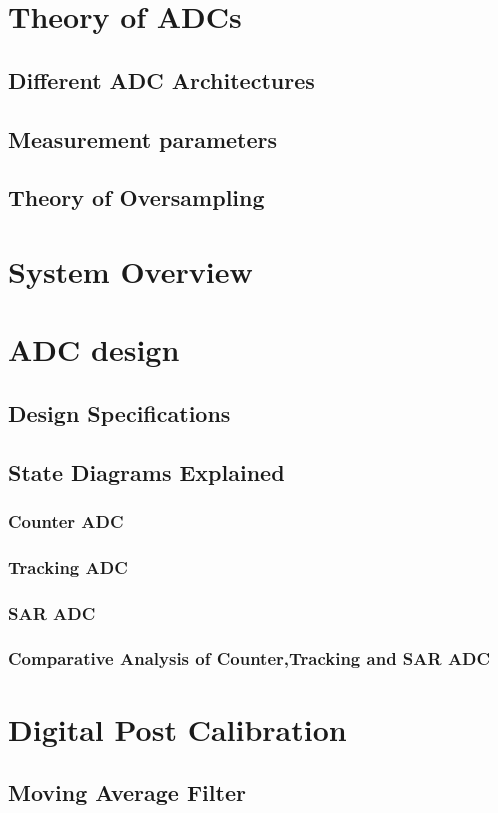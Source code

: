 \documentclass[linedtoc,
               parskip,
               twoside,
               longdoc,
               11pt,
               noheadingspace,
               accentcolor=tud1d,
               bigchapter,
               colorback]{tudreport}
\begin{document}
\chapter{Theory of ADCs}
 \section{Different ADC Architectures}
  \section{Measurement parameters}
  \section{Theory of Oversampling}
\chapter{System Overview}
\chapter{ADC design}
  \section{Design Specifications}
  \section{State Diagrams Explained}
  \subsection{Counter ADC}
   \subsection{Tracking ADC}
    \subsection{SAR ADC}
    \subsection{Comparative Analysis of Counter,Tracking and SAR ADC}
\chapter{Digital Post Calibration}
\section{Moving Average Filter}
\end{document}
